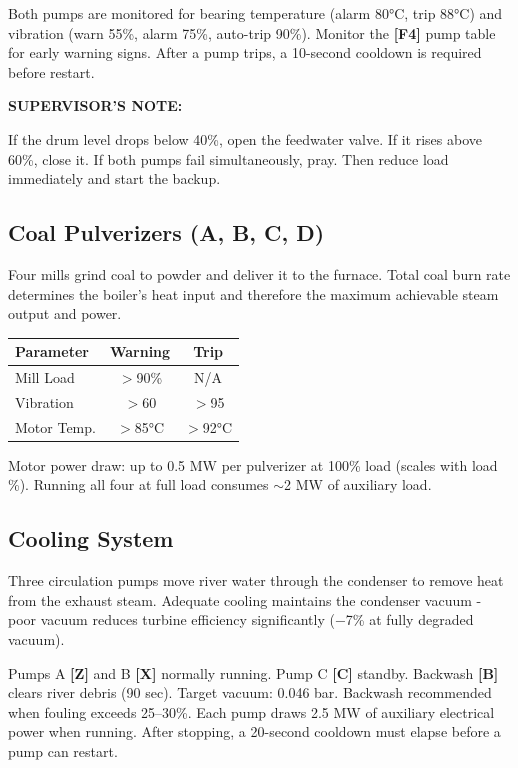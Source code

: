 \documentclass[10pt,a5paper]{article}
\newenvironment{notebox}{%
  \vspace{4pt}%
  \textbf{SUPERVISOR'S NOTE:} \bfseries%
}{%
}
\newcommand{\key}[1]{\textbf{[#1]}}
\begin{document}
Both pumps are monitored for bearing temperature (alarm 80°C, trip 88°C) and
vibration (warn 55\%, alarm 75\%, auto-trip 90\%). Monitor the \key{F4} pump table for
early warning signs. After a pump trips, a 10-second cooldown is required before
restart.

\begin{notebox}
If the drum level drops below 40\%, open the feedwater valve. If it rises above
60\%, close it. If both pumps fail simultaneously, pray. Then reduce load
immediately and start the backup.
\end{notebox}

\subsection{Coal Pulverizers (A, B, C, D)}

Four mills grind coal to powder and deliver it to the furnace. Total coal burn
rate determines the boiler's heat input and therefore the maximum achievable
steam output and power.

\begin{center}
\small
\begin{tabular}{lcc}
\toprule
\textbf{Parameter} & \textbf{Warning} & \textbf{Trip} \\
\midrule
Mill Load     & $>$90\%  & N/A     \\
Vibration     & $>$60    & $>$95   \\
Motor Temp.   & $>$85°C  & $>$92°C \\
\bottomrule
\end{tabular}
\end{center}

Motor power draw: up to 0.5 MW per pulverizer at 100\% load (scales with load \%). Running
all four at full load consumes $\sim$2 MW of auxiliary load.

\subsection{Cooling System}

Three circulation pumps move river water through the condenser to remove heat
from the exhaust steam. Adequate cooling maintains the condenser vacuum - poor
vacuum reduces turbine efficiency significantly (−7\% at fully degraded vacuum).

Pumps A \key{Z} and B \key{X} normally running. Pump C \key{C} standby.
Backwash \key{B} clears river debris (90 sec). Target vacuum: 0.046 bar.
Backwash recommended when fouling exceeds 25--30\%. Each pump draws 2.5 MW of
auxiliary electrical power when running. After stopping, a 20-second cooldown
must elapse before a pump can restart.
\end{document}
